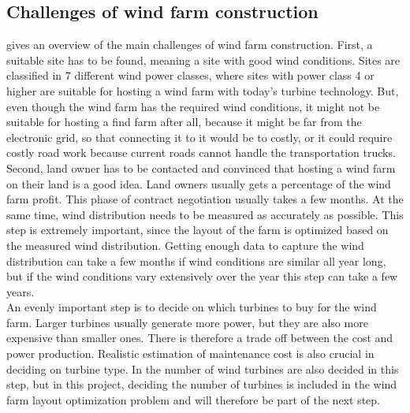 \subsection{Challenges of wind farm construction}
\cite{Samorani} gives an overview of the main challenges of wind farm construction. First, a suitable site has to be found, meaning a site with good wind conditions. Sites are classified in 7 different wind power classes, where sites with power class 4 or higher are suitable for hosting a wind farm with today's turbine technology. But, even though the wind farm has the required wind conditions, it might not be suitable for hosting a find farm after all, because it might be far from the electronic grid, so that connecting it to it would be to costly, or it could require costly road work because current roads cannot handle the transportation trucks.\\

\noindent Second, land owner has to be contacted and convinced that hosting a wind farm on their land is a good idea. Land owners usually gets a percentage of the wind farm profit. This phase of contract negotiation  usually takes a few months. At the same time, wind distribution needs to be measured as accurately as possible. This step is extremely important, since the layout of the farm is optimized based on the measured wind distribution. Getting enough data to capture the wind distribution can take a few months if wind conditions are similar all year long, but if the wind conditions vary extensively over the year this step can take a few years. \\

\noindent An evenly important step is to decide on which turbines to buy for the wind farm. Larger turbines usually generate more power, but they are also more expensive than smaller ones. There is therefore a trade off between the cost and power production. Realistic estimation of maintenance cost is also crucial in deciding on turbine type. In \cite{Samorani} the number of wind turbines are also decided in this step, but in this project, deciding the number of turbines is included in the wind farm layout optimization problem and will therefore be part of the next step. \\

